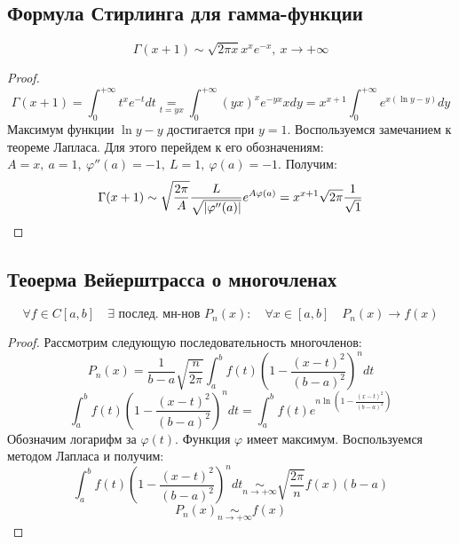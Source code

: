 \documentclass[../main.tex]{subfiles}
\begin{document}
\subsection{Формула Стирлинга для гамма-функции}
\begin{theorem}
    $$\Gamma(x + 1) \sim \sqrt{2\pi x} x^x e^{-x}, \ x \rightarrow + \infty$$
\end{theorem}
\begin{proof}
$$\Gamma(x + 1) = \int_0^{+ \infty} t^x e^{-t} dt \underset{t = yx}{=} \int_0^{+ \infty} (yx)^x e^{-yx} x dy = x^{x + 1} \int_0^{+ \infty} e^ {x(\ln y - y)} dy$$
Максимум функции $\ln y - y$ достигается при $y = 1$. Воспользуемся замечанием к теореме Лапласа. Для этого перейдем к его обозначениям:
$A = x, \ a = 1, \ \varphi''(a) = -1, \ L = 1, \ \varphi(a) = -1$. Получим:
$$\Gamma (x + 1) \sim \sqrt{\frac{2 \pi}{A}} \frac{L}{\sqrt{\left| \varphi''(a) \right|}} e^{A \varphi(a)} = x ^ {x + 1} \sqrt{2 \pi} \frac{1}{\sqrt{1}}$$
\end{proof}
\newpage

\subsection{Теоерма Вейерштрасса о многочленах}
\begin{theorem}
    $$\forall f \in C[a, b] \quad \exists \text{~послед. мн-нов~} P_n(x): \quad \forall x \in [a, b] \quad P_n(x) \rightarrow f(x)$$
\end{theorem}
\begin{proof}
Рассмотрим следующую последовательность многочленов: %
$$P_n(x) = \frac {1}{b - a} \sqrt{\frac{n}{2 \pi}} \int_a^b f(t) \left( 1 - \frac{(x - t)^2}{(b - a)^2} \right)^n dt$$
$$\int_a^b f(t) \left( 1 - \frac{(x - t)^2}{(b - a)^2} \right)^n dt = 
\int_a^b f(t) e^{n \ln\left(1 - \frac{(x - t)^2}{(b - a)^2}\right)}$$
Обозначим логарифм за $\varphi(t)$. Функция $\varphi$ имеет максимум. Воспользуемся методом Лапласа и получим:
$$\int_a^b f(t) \left( 1 - \frac{(x - t)^2}{(b - a)^2} \right)^n dt \underset{n \rightarrow + \infty}{\sim} \sqrt{\frac{2 \pi}{n}} f(x) (b - a)$$
$$P_n(x) \underset{n \rightarrow + \infty}{\sim} f(x)$$
\end{proof}
\newpage
\end{document}

